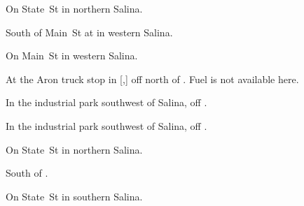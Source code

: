 
\begin{LocationList}

On  State~St in northern Salina.

South of Main~St at  in western Salina.

On Main~St in western Salina.

At the Aron truck stop in [,] off  north of .
Fuel is not available here.

In the industrial park southwest of Salina, off  .

In the industrial park southwest of Salina, off  .

On  State~St in northern Salina.

\Location{\TruckStop \Gas \Rest \Weigh}
South of  .

On   State~St in southern Salina.

\end{LocationList}
